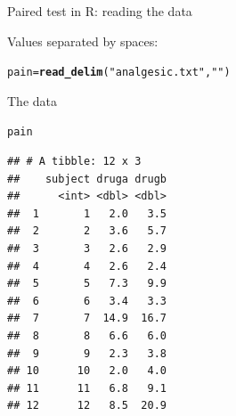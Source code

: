 \documentclass[unknownkeysallowed]{beamer}\usepackage[]{graphicx}\usepackage[]{color}
\makeatletter
\newcommand{\hlstr}[1]{\textcolor[rgb]{0.192,0.494,0.8}{#1}}%
\newcommand{\hlstd}[1]{\textcolor[rgb]{0.345,0.345,0.345}{#1}}%
\newcommand{\hlkwb}[1]{\textcolor[rgb]{0.69,0.353,0.396}{#1}}%
\newcommand{\hlkwd}[1]{\textcolor[rgb]{0.737,0.353,0.396}{\textbf{#1}}}%
\newenvironment{kframe}{%
 \def\at@end@of@kframe{}%
 \ifinner\ifhmode%
  \def\at@end@of@kframe{\end{minipage}}%
  \begin{minipage}{\columnwidth}%
 \fi\fi%
 \def\FrameCommand##1{\hskip\@totalleftmargin \hskip-\fboxsep
 \colorbox{shadecolor}{##1}\hskip-\fboxsep
     \hskip-\linewidth \hskip-\@totalleftmargin \hskip\columnwidth}%
 \MakeFramed {\advance\hsize-\width
   \@totalleftmargin\z@ \linewidth\hsize
   \@setminipage}}%
 {\par\unskip\endMakeFramed%
 \at@end@of@kframe}
\newenvironment{knitrout}{}{} %
\makeatother
\begin{document}
\begin{frame}[fragile]{Paired test in R: reading the data}

  Values separated by spaces:
  
\begin{knitrout}
\color{fgcolor}\begin{kframe}
\begin{alltt}
\hlstd{pain}\hlkwb{=}\hlkwd{read_delim}\hlstd{(}\hlstr{"analgesic.txt"}\hlstd{,}\hlstr{" "}\hlstd{)}
\end{alltt}


{\ttfamily\noindent\itshape\color{messagecolor}{\#\# Parsed with column specification:\\\#\# cols(\\\#\#\ \  subject = col\_integer(),\\\#\#\ \  druga = col\_double(),\\\#\#\ \  drugb = col\_double()\\\#\# )}}\end{kframe}
\end{knitrout}
    
\end{frame}

\begin{frame}[fragile]{The data}
\begin{knitrout}
\color{fgcolor}\begin{kframe}
\begin{alltt}
\hlstd{pain}
\end{alltt}
\begin{verbatim}
## # A tibble: 12 x 3
##    subject druga drugb
##      <int> <dbl> <dbl>
##  1       1   2.0   3.5
##  2       2   3.6   5.7
##  3       3   2.6   2.9
##  4       4   2.6   2.4
##  5       5   7.3   9.9
##  6       6   3.4   3.3
##  7       7  14.9  16.7
##  8       8   6.6   6.0
##  9       9   2.3   3.8
## 10      10   2.0   4.0
## 11      11   6.8   9.1
## 12      12   8.5  20.9
\end{verbatim}
\end{kframe}
\end{knitrout}
\end{frame}
\end{document}
